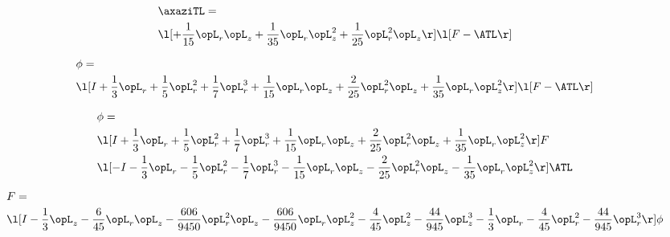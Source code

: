 \begin{alignat}{2} 
\label{eq:linaxaziTL_1} 
& \axaziTL = \\ 
& \l[ + \frac{1}{15} \opL_r \opL_z + \frac{1}{35} \opL_r \opL_z^{2} + \frac{1}{25} \opL_r^{2} \opL_z  \r] \l[ F - \ATL \r] \nonumber \\ 
\end{alignat} 


\begin{alignat}{2} 
\label{eq:scalarFlux_1} 
& \phi = \\ 
& \l[ I + \frac{1}{3} \opL_r + \frac{1}{5} \opL_r^{2} + \frac{1}{7} \opL_r^{3} + \frac{1}{15} \opL_r \opL_z + \frac{2}{25} \opL_r^{2} \opL_z + \frac{1}{35} \opL_r \opL_z^{2}  \r] \l[ F - \ATL \r] \nonumber \\ 
\end{alignat} 


\begin{alignat}{2} 
\label{eq:scalarFlux_2} 
& \phi = \\ 
& \l[ I + \frac{1}{3} \opL_r + \frac{1}{5} \opL_r^{2} + \frac{1}{7} \opL_r^{3} + \frac{1}{15} \opL_r \opL_z + \frac{2}{25} \opL_r^{2} \opL_z + \frac{1}{35} \opL_r \opL_z^{2}  \r] F \nonumber \\ 
& \l[ - I - \frac{1}{3} \opL_r - \frac{1}{5} \opL_r^{2} - \frac{1}{7} \opL_r^{3} - \frac{1}{15} \opL_r \opL_z - \frac{2}{25} \opL_r^{2} \opL_z - \frac{1}{35} \opL_r \opL_z^{2}  \r] \ATL \nonumber \\ 
\end{alignat} 


\begin{alignat}{2} 
\label{eq:transport3D_0} 
& F = \\ 
& \l[ I - \frac{1}{3} \opL_z - \frac{6}{45} \opL_r \opL_z - \frac{606}{9450} \opL_r^{2} \opL_z - \frac{606}{9450} \opL_r \opL_z^{2} - \frac{4}{45} \opL_z^{2} - \frac{44}{945} \opL_z^{3} - \frac{1}{3} \opL_r - \frac{4}{45} \opL_r^{2} - \frac{44}{945} \opL_r^{3}  \r] \phi \nonumber \\ 
\end{alignat} 


